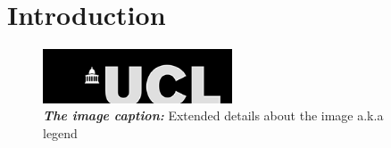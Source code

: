 \section{Introduction} 
\blindtext  %
\newline 
\blindtext


\begin{figure}[H] %
    \centering %
    \includegraphics[width=0.5\textwidth]{Image/ucl_logo.png} 
    \caption[The caption that goes into the list of figures]{\textit{\textbf{The image caption:}} Extended details about the image a.k.a legend}
    \label{name the figures for cross reference}
\end{figure}


\blindtext 
\cite{benner_2003} %


